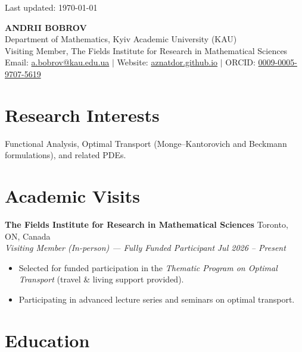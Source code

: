 \documentclass[10pt, a4paper]{article}
\newcommand{\entry}[4]{
  \noindent \textbf{#1} \hfill #2 \\
  \textit{#3} \hfill \textit{#4} \vspace{0.5pt}
}
\begin{document}
\pagestyle{empty}

\hfill {\scriptsize \color{gray} Last updated: \today}
\vspace{-0.8em}

\begin{center}
    {\LARGE \textbf{ANDRII BOBROV}} \\[2pt]
    Department of Mathematics, Kyiv Academic University (KAU) \\
    Visiting Member, The Fields Institute for Research in Mathematical Sciences \\
    \smallskip
    {\small
    Email: \href{mailto:a.bobrov@kau.edu.ua}{a.bobrov@kau.edu.ua} \quad$|$\quad
    Website: \href{https://aznatdor.github.io}{aznatdor.github.io} \quad$|$\quad
    ORCID: \href{https://orcid.org/0009-0005-9707-5619}{0009-0005-9707-5619}
    }
\end{center}
\vspace{-6pt}

\section{Research Interests}
\noindent
Functional Analysis, Optimal Transport (Monge--Kantorovich and Beckmann formulations), and related PDEs.

\section{Academic Visits}

\entry{The Fields Institute for Research in Mathematical Sciences}{Toronto, ON, Canada}
{Visiting Member (In-person) --- Fully Funded Participant}{Jul 2026 -- Present}
\begin{itemize}
    \item Selected for funded participation in the \textit{Thematic Program on Optimal Transport} (travel \& living support provided).
    \item Participating in advanced lecture series and seminars on optimal transport.
\end{itemize}

\section{Education}
\end{document}
